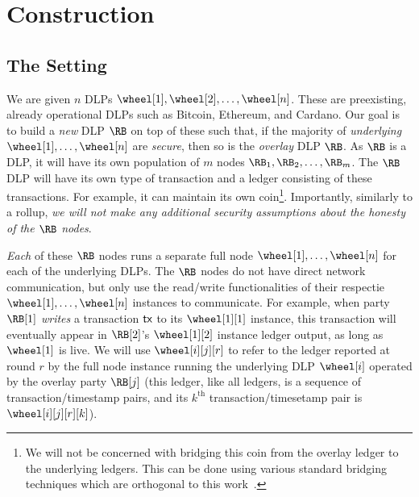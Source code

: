\section{Construction}\label{sec:construction}

\subsection{The Setting}

We are given $n$ DLPs $\wheel[1], \wheel[2], \ldots, \wheel[n]$. These are preexisting, already operational
DLPs such as Bitcoin, Ethereum, and Cardano. Our goal is to build a \emph{new} DLP $\RB$
on top of these such that, if the majority of \emph{underlying}
$\wheel[1], \ldots, \wheel[n]$ are \emph{secure}, then so is the
\emph{overlay} DLP $\RB$. As $\RB$ is a DLP, it will have its own population of $m$ nodes
$\RB_1, \RB_2, \ldots, \RB_m$. The $\RB$ DLP will have its own type of transaction and a
ledger consisting of these transactions. For example, it can maintain its own coin\footnote{
We will not be concerned with bridging this coin from the overlay ledger to the underlying
ledgers. This can be done using various standard bridging techniques which are orthogonal
to this work~\cite{pow-sidechains,pos-sidechains,zkbridge}.}. Importantly, similarly to
a rollup, \emph{we will not make any additional security assumptions about the honesty of the
$\RB$ nodes}.

\emph{Each} of these $\RB$ nodes runs a separate full node $\wheel[1], \ldots, \wheel[n]$ for each of
the underlying DLPs. The $\RB$ nodes do not have direct network communication, but only
use the read/write functionalities of their respectie $\wheel[1], \ldots, \wheel[n]$ instances to communicate.
For example, when party $\RB[1]$ \emph{writes} a transaction $\textsf{tx}$ to its $\wheel[1][1]$ instance,
this transaction will eventually appear in $\RB[2]$'s $\wheel[1][2]$ instance ledger output,
as long as $\wheel[1]$ is live.
We will use $\wheel[i][j][r]$ to refer to the ledger reported at round $r$ by the full node instance
running the underlying DLP $\wheel[i]$ operated by the overlay party $\RB[j]$
(this ledger, like all ledgers, is a sequence of transaction/timestamp pairs, and its
$k^\text{th}$ transaction/timesetamp pair is $\wheel[i][j][r][k]$).

